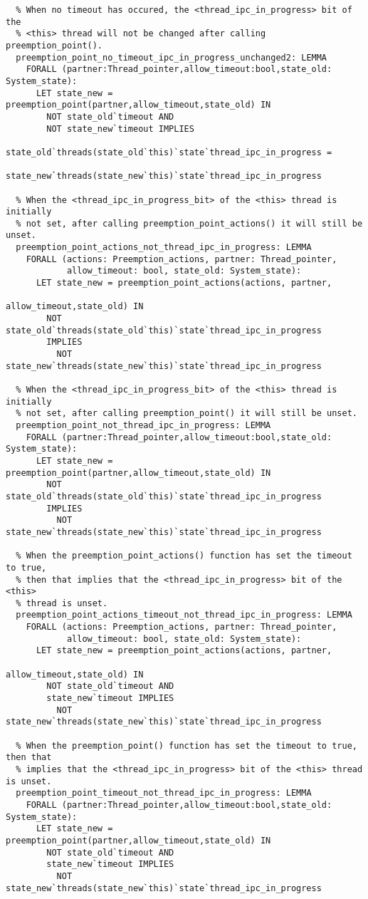 \begin{lstlisting}
  % When no timeout has occured, the <thread_ipc_in_progress> bit of the
  % <this> thread will not be changed after calling preemption_point().
  preemption_point_no_timeout_ipc_in_progress_unchanged2: LEMMA
    FORALL (partner:Thread_pointer,allow_timeout:bool,state_old: System_state):
      LET state_new = preemption_point(partner,allow_timeout,state_old) IN
        NOT state_old`timeout AND 
        NOT state_new`timeout IMPLIES
          state_old`threads(state_old`this)`state`thread_ipc_in_progress =
            state_new`threads(state_new`this)`state`thread_ipc_in_progress
  
  % When the <thread_ipc_in_progress_bit> of the <this> thread is initially 
  % not set, after calling preemption_point_actions() it will still be unset.
  preemption_point_actions_not_thread_ipc_in_progress: LEMMA
    FORALL (actions: Preemption_actions, partner: Thread_pointer,
            allow_timeout: bool, state_old: System_state):
      LET state_new = preemption_point_actions(actions, partner,
                                               allow_timeout,state_old) IN
        NOT state_old`threads(state_old`this)`state`thread_ipc_in_progress
        IMPLIES
          NOT state_new`threads(state_new`this)`state`thread_ipc_in_progress

  % When the <thread_ipc_in_progress_bit> of the <this> thread is initially
  % not set, after calling preemption_point() it will still be unset.
  preemption_point_not_thread_ipc_in_progress: LEMMA
    FORALL (partner:Thread_pointer,allow_timeout:bool,state_old: System_state):
      LET state_new = preemption_point(partner,allow_timeout,state_old) IN
        NOT state_old`threads(state_old`this)`state`thread_ipc_in_progress
        IMPLIES
          NOT state_new`threads(state_new`this)`state`thread_ipc_in_progress

  % When the preemption_point_actions() function has set the timeout to true, 
  % then that implies that the <thread_ipc_in_progress> bit of the <this> 
  % thread is unset.
  preemption_point_actions_timeout_not_thread_ipc_in_progress: LEMMA
    FORALL (actions: Preemption_actions, partner: Thread_pointer,
            allow_timeout: bool, state_old: System_state):
      LET state_new = preemption_point_actions(actions, partner,
                                               allow_timeout,state_old) IN
        NOT state_old`timeout AND 
        state_new`timeout IMPLIES 
          NOT state_new`threads(state_new`this)`state`thread_ipc_in_progress

  % When the preemption_point() function has set the timeout to true, then that
  % implies that the <thread_ipc_in_progress> bit of the <this> thread is unset.
  preemption_point_timeout_not_thread_ipc_in_progress: LEMMA
    FORALL (partner:Thread_pointer,allow_timeout:bool,state_old: System_state):
      LET state_new = preemption_point(partner,allow_timeout,state_old) IN
        NOT state_old`timeout AND 
        state_new`timeout IMPLIES 
          NOT state_new`threads(state_new`this)`state`thread_ipc_in_progress


\end{lstlisting}
